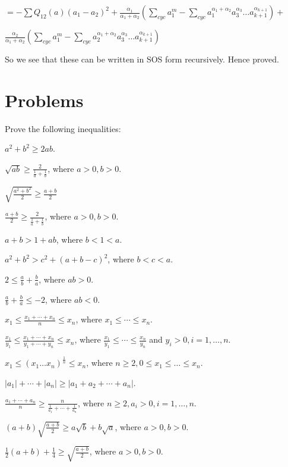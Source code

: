   $= -\sum Q_{12}(a)(a_1 - a_2)^2 + \frac{\alpha_1}{\alpha_1 + \alpha_2}\left(\sum_{cyc} a_1^m - \sum_{cyc}a_1^{\alpha_1 +
    \alpha_2}a_3^{\alpha_3}\ldots a_{k+1}^{\alpha_{k+1}}\right) + $

  $\frac{\alpha_2}{\alpha_1 + \alpha_2}\left(\sum_{cyc} a_1^m - \sum_{cyc}a_2^{\alpha_1 + \alpha_2}a_3^{\alpha_3}\ldots a_{k+1}^{\alpha_{k+1}}\right)$

  So we see that these can be written in SOS form recursively. Hence proved.
\stopproof

\section{Problems}
Prove the following inequalities:

\startitemize[n, 1*broad]
\item $a^2 + b^2 \geq 2ab$.
\item $\sqrt{ab}\geq \frac{2}{\frac{1}{a} + \frac{1}{b}}$, where $a>0, b>0$.
\item $\sqrt{\frac{a^2 + b^2}{2}}\geq \frac{a + b}{2}$
\item $\frac{a + b}{2}\geq \frac{2}{\frac{1}{a} + \frac{1}{b}}$, where $a>0, b>0$.
\item $a + b > 1 + ab$, where $b < 1 < a$.
\item $a^2 + b^2 > c^2 + (a + b - c)^2$, where $b < c< a$.
\item $2\leq \frac{a}{b} + \frac{b}{a}$, where $ab > 0$.
\item $\frac{a}{b} + \frac{b}{a}\leq -2$, where $ab < 0$.
\item $x_1\leq \frac{x_1 + \cdots + x_n}{n}\leq x_n$, where $x_1\leq \cdots\leq x_n$.
\item $\frac{x_1}{y_1}\leq \frac{x_1 + \cdots + x_n}{y_1 + \cdots + y_n}\leq x_n$, where $\frac{x_1}{y_1}\leq\cdots\leq
  \frac{x_n}{y_n}$ and $y_i> 0, i=1, \ldots, n$.
\item $x_1\leq(x_1\ldots x_n)^{\tfrac{1}{n}}\leq x_n$, where $n\geq 2, 0\leq x_1\leq\ldots\leq x_n$.
\item $|a_1| + \cdots + |a_n|\geq |a_1 + a_2 + \cdots + a_n|$.
\item $\frac{a_1 + \cdots + a_n}{n}\geq \frac{n}{\frac{1}{a_1} + \cdots + \frac{1}{a_n}}$, where $n\geq 2, a_i> 0, i=1, \ldots, n$.
\item $(a + b)\sqrt{\frac{a + b}{2}} \geq a\sqrt{b} + b\sqrt{a}$, where $a > 0, b > 0$.
\item $\frac{1}{2}(a + b) + \frac{1}{4}\geq \sqrt{\frac{a + b}{2}}$, where $a > 0, b > 0$.
